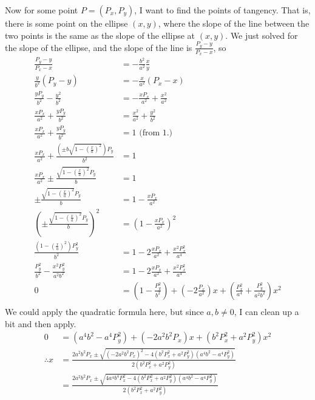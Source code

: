 \documentclass[11pt, oneside]{article}
\begin{document}
\begin{enumerate}
		Now for some point $P=(P_x,P_y)$, I want to find the points of tangency. That is, there is some point on the ellipse $(x,y)$, where the slope of
		the line between the two points is the same as the slope of the ellipse at $(x, y)$. We just solved for the slope of the ellipse, and the slope
		of the line is $\frac{P_y - y}{P_x-x}$, so 
		\begin{align*}
			\frac{P_y - y}{P_x-x}&=-\frac{b^2}{a^2}\frac{x}{y}\\
			\frac{y}{b^2}(P_y-y)&=-\frac{x}{a^2}(P_x-x)\\
			\frac{yP_y}{b^2}-\frac{y^2}{b^2}&=-\frac{xP_x}{a^2} + \frac{x^2}{a^2}\\
			\frac{xP_x}{a^2}+\frac{yP_y}{b^2}&=\frac{x^2}{a^2}+\frac{y^2}{b^2}\\
			\frac{xP_x}{a^2}+\frac{yP_y}{b^2}&=1 \text{ (from 1.)}\\
			\frac{xP_x}{a^2}+\frac{\left(\pm b\sqrt{1- \left(\frac x a\right)^2} \right)P_y}{b^2}&=1\\
			\frac{xP_x}{a^2}\pm\frac{\sqrt{1- \left(\frac x a\right)^2} P_y}{b}&=1\\
			\pm\frac{\sqrt{1- \left(\frac x a\right)^2} P_y}{b}&=1-\frac{xP_x}{a^2}\\
			\left(\pm\frac{\sqrt{1- \left(\frac x a\right)^2} P_y}{b}\right)^2&=\left(1-\frac{xP_x}{a^2}\right)^2\\
			\frac{\left(1- \left(\frac x a\right)^2\right) P_y^2}{b^2}&=1 - 2\frac{xP_x}{a^2} + \frac{x^2P_x^2}{a^4}\\
			\frac{P_y^2}{b^2} - \frac{x^2P_y^2}{a^2b^2}&=1 - 2\frac{xP_x}{a^2} + \frac{x^2P_x^2}{a^4}\\
			0 &=\left(1-\frac{P_y^2}{b^2}\right) + \left(- 2\frac{P_x}{a^2}\right)x + \left(\frac{P_x^2}{a^4} +  \frac{P_y^2}{a^2b^2}\right)x^2\\
		\end{align*}
		We could apply the quadratic formula here, but since $a,b\ne 0$, I can clean up a bit and then apply.
		\begin{align*}
			0 &=\left(a^4b^2-a^4P_y^2\right) + \left(- 2a^2b^2P_x\right)x + \left(b^2P_x^2 + a^2P_y^2\right)x^2\\
			\therefore x&= \frac{2a^2b^2P_x\pm\sqrt{\left(-2a^2b^2P_x\right)^2 - 4\left(b^2P_x^2+a^2P_y^2\right)\left(a^4b^2-a^4P_y^2\right)}}{2(b^2P_x^2+a^2P_y^2)}\\
			&= \frac{2a^2b^2P_x\pm\sqrt{4a^4b^4P_x^2 - 4\left(b^2P_x^2+a^2P_y^2\right)\left(a^4b^2-a^4P_y^2\right)}}{2(b^2P_x^2+a^2P_y^2)}\\

\end{align*}
\end{enumerate}
\end{document}

